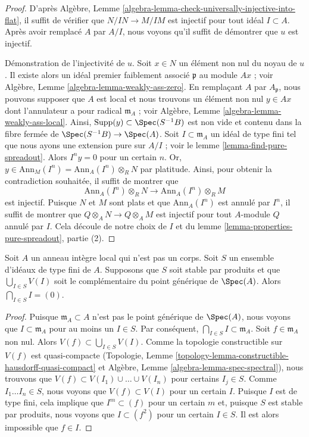 \begin{proof}
D'après Algèbre, Lemme \ref{algebra-lemma-check-universally-injective-into-flat},
il suffit de vérifier que $N/IN \to M/IM$ est injectif pour tout
idéal $I \subset A$. Après avoir remplacé $A$ par $A/I$, nous voyons qu'il suffit
de démontrer que $u$ est injectif.

\medskip\noindent
Démonstration de l'injectivité de $u$. Soit $x \in N$ un élément non nul du
noyau de $u$. Il existe alors un idéal premier faiblement associé $\mathfrak p$
au module $Ax$ ; voir Algèbre, Lemme \ref{algebra-lemma-weakly-ass-zero}.
En remplaçant $A$ par $A_\mathfrak p$, nous pouvons supposer que $A$ est local et
nous trouvons un élément non nul $y \in Ax$ dont l'annulateur a pour radical
$\mathfrak m_A$ ; voir
Algèbre, Lemme \ref{algebra-lemma-weakly-ass-local}.
Ainsi, $\text{Supp}(y) \subset \Spec(S^{-1}B)$ est non vide et
contenu dans la fibre fermée de $\Spec(S^{-1}B) \to \Spec(A)$.
Soit $I \subset \mathfrak m_A$ un
idéal de type fini tel que nous ayons une extension pure sur $A/I$ ; voir le
lemme \ref{lemma-find-pure-spreadout}. Alors $I^n y = 0$ pour un certain $n$. Or,
$y \in \text{Ann}_M(I^n) = \text{Ann}_A(I^n) \otimes_R N$ par platitude.
Ainsi, pour obtenir la contradiction souhaitée, il suffit de montrer que
$$
\text{Ann}_A(I^n) \otimes_R N
\longrightarrow
\text{Ann}_A(I^n) \otimes_R M
$$
est injectif. Puisque $N$ et $M$ sont plats et que $\text{Ann}_A(I^n)$
est annulé par $I^n$, il suffit de montrer que
$Q \otimes_A N \to Q \otimes_A M$ est injectif pour tout $A$-module
$Q$ annulé par $I$. Cela découle de notre choix de $I$ et du
lemme \ref{lemma-properties-pure-spreadout}, partie (2).
\end{proof}

\begin{lemma}
\label{lemma-big-intersection-is-zero}
Soit $A$ un anneau intègre local qui n'est pas un corps.
Soit $S$ un ensemble d'idéaux de type fini de $A$.
Supposons que $S$ soit stable par produits et que
$\bigcup_{I \in S} V(I)$ soit le complémentaire du point générique de $\Spec(A)$.
Alors $\bigcap_{I \in S} I = (0)$.
\end{lemma}

\begin{proof}
Puisque $\mathfrak m_A \subset A$ n'est pas le point générique de $\Spec(A)$,
nous voyons que $I \subset \mathfrak m_A$ pour au moins un $I \in S$.
Par conséquent, $\bigcap_{I \in S} I \subset \mathfrak m_A$.
Soit $f \in \mathfrak m_A$ non nul. Alors
$V(f) \subset \bigcup_{I \in S} V(I)$.
Comme la topologie constructible sur $V(f)$ est quasi-compacte
(Topologie, Lemme \ref{topology-lemma-constructible-hausdorff-quasi-compact}
et
Algèbre, Lemme \ref{algebra-lemma-spec-spectral}),
nous trouvons que $V(f) \subset V(I_1) \cup \ldots \cup V(I_n)$
pour certains $I_j \in S$. Comme $I_1 \ldots I_n \in S$, nous voyons que
$V(f) \subset V(I)$ pour un certain $I$. Puisque $I$ est de type fini,
cela implique que $I^m \subset (f)$ pour un certain $m$ et, puisque
$S$ est stable par produits, nous voyons que $I \subset (f^2)$ pour
un certain $I \in S$. Il est alors impossible que $f \in I$.
\end{proof}

